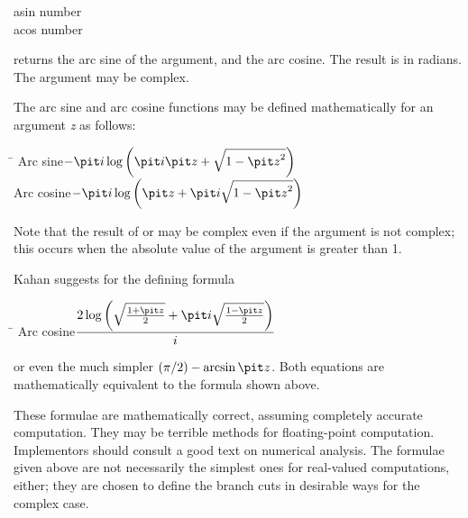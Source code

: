 \begin{defun}[Function]
asin number \\
acos number

 returns the arc sine of the argument, and  the arc cosine.
The result is in radians.  The argument may be complex.

The arc sine and arc cosine functions may be defined mathematically for
an argument {\it z} as follows:
\begin{tabbing}
\hskip 10pc\=\kill
Arc sine\>\( -{\it i} \log \left({\it i}{\it z} + \sqrt{1-{\it z}^2}\right) \) \\[2pt]
Arc cosine\>\( -{\it i} \log \left({\it z} + {\it i}\sqrt{1-{\it z}^2}\right) \)
\end{tabbing}
Note that the result of  or  may be
complex even if the argument is not complex; this occurs
when the absolute value of the argument is greater than 1.

\begin{newer}
Kahan \cite{KAHAN-COMPLEX-FNS} suggests for  the
defining formula
\begin{tabbing}
\hskip 10pc\=\kill
Arc cosine\>\(  \displaystyle { 2 \log \left( \sqrt{{1+{\it z} \over 2}} + {\it i} \sqrt{{1-{\it z} \over 2}} \right) \over i}\)
\end{tabbing}
or even the much simpler \( (\pi/2)-\arcsin {\it z} \).  Both equations are mathematically
equivalent to the formula shown above.
\end{newer}

\beforenoterule
\begin{implementation}
These formulae are mathematically correct, assuming
completely accurate computation.  They may be terrible methods for
floating-point computation.  Implementors should consult a good text on
numerical analysis.  The formulae given above are not necessarily
the simplest ones for real-valued computations, either; they are chosen
to define the branch cuts in desirable ways for the complex case.
\end{implementation}
\afternoterule
\end{defun}

